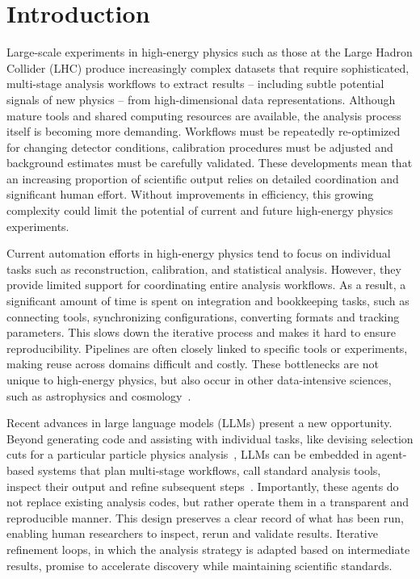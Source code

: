 \documentclass[submission, Phys]{SciPost}
\begin{document}
\section{Introduction}

Large-scale experiments in high-energy physics such as those at the Large Hadron Collider (LHC)  produce increasingly complex datasets that require sophisticated, multi-stage analysis workflows to extract results -- including subtle potential signals of new physics -- from high-dimensional data representations. Although mature tools and shared computing resources are available, the analysis process itself is becoming more demanding. Workflows must be repeatedly re-optimized for changing detector conditions, calibration procedures must be adjusted and background estimates must be carefully validated. These developments mean that an increasing proportion of scientific output relies on detailed coordination and significant human effort. Without improvements in efficiency, this growing complexity could limit the potential of current and future high-energy physics experiments.

Current automation efforts in high-energy physics tend to focus on individual tasks such as reconstruction, calibration, and statistical analysis. However, they provide limited support for coordinating entire analysis workflows. As a result, a significant amount of time is spent on integration and bookkeeping tasks, such as connecting tools, synchronizing configurations, converting formats and tracking parameters. This slows down the iterative process and makes it hard to ensure reproducibility. Pipelines are often closely linked to specific tools or experiments, making reuse across domains difficult and costly. These bottlenecks are not unique to high-energy physics, but also occur in other data-intensive sciences, such as astrophysics and cosmology~\cite{Laverick2024CosmoAgents,Moss2025AICosmologist}.

Recent advances in large language models (LLMs) present a new opportunity. Beyond  generating code and assisting with individual tasks, like devising selection cuts for a particular particle physics analysis~\cite{Saqlain:2025owc}, LLMs can be embedded in agent-based systems that plan multi-stage workflows, call standard analysis tools, inspect their output and refine subsequent steps~\cite{Eger2025Survey,Ren2025SciAgentsSurvey,Chen2024ToolAlign,Su2024DRAGIN,Xu2025AMem,Gemini2025}. Importantly, these agents do not replace existing analysis codes, but rather operate them in a transparent and reproducible manner. This design preserves a clear record of what has been run, enabling human researchers to inspect, rerun and validate results. Iterative refinement loops, in which the analysis strategy is adapted based on intermediate results, promise to accelerate discovery while maintaining scientific standards.
\end{document}
